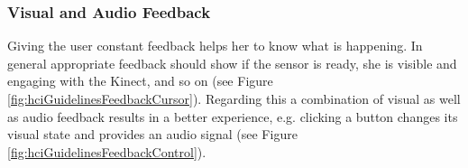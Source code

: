 \subsubsection{Visual and Audio Feedback}
Giving the user constant feedback helps her to know what is happening. In general appropriate feedback should show if the sensor is ready, she is visible and engaging with the Kinect, and so on (see Figure \ref{fig:hciGuidelinesFeedbackCursor}). Regarding this a combination of visual as well as audio feedback results in a better experience, e.g. clicking a button changes its visual state and provides an audio signal (see Figure \ref{fig:hciGuidelinesFeedbackControl}).

